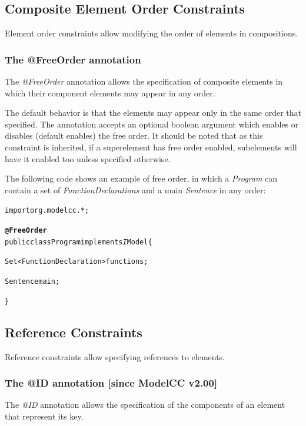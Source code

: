 \documentclass[a4paper,twoside,onecolumn]{article}
\newenvironment{colframe}{%
  \begin{Sbox} 
    \begin{minipage}{.8\columnwidth} 
}{%

  \end{minipage} 
  \end{Sbox} 
  \begin{center} 
    \fcolorbox{black}{MyGray}{\TheSbox} 
  \end{center} 
}
\newcommand{\an}[1]{\emph{#1}} %
\begin{document}
\subsection{Composite Element Order Constraints}

Element order constraints allow modifying the order of elements in compositions.

\subsubsection{The @FreeOrder annotation}

The \an{@FreeOrder} annotation allows the specification of composite elements in which their component elements may appear in any order.

The default behavior is that the elements may appear only in the same order that specified. The annotation accepts an optional boolean argument which enables or disables (default enables) the free order. It should be noted that as this constraint is inherited, if a superelement has free order enabled, subelements will have it enabled too unless specified otherwise.

The following code shows an example of free order, in which a \emph{Program} can contain a set of \emph{FunctionDeclarations} and a main \emph{Sentence} in any order:

\begin{colframe}
\begin{alltt}
import org.modelcc.*;

{\bf @FreeOrder}
public class Program implements{\emph IModel} \{

  Set<FunctionDeclaration> functions;

  Sentence main;

\}
\end{alltt}
\end{colframe}

\subsection{Reference Constraints}

Reference constraints allow specifying references to elements.

\subsubsection{The @ID annotation [since ModelCC v2.00]}

The \an{@ID} annotation allows the specification of the components of an element that represent its key.
\end{document}
